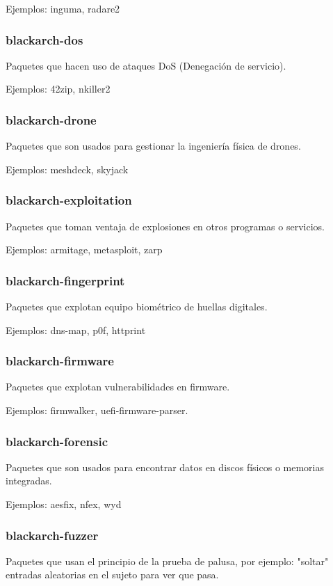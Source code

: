\documentclass[a4paper, oneside, 11pt]{book}
\begin{document}
Ejemplos: inguma, radare2

\subsubsection{blackarch-dos}
Paquetes que hacen uso de ataques DoS (Denegación de servicio).

Ejemplos: 42zip, nkiller2

\subsubsection{blackarch-drone}
Paquetes que son usados para gestionar la ingeniería física de drones.

Ejemplos: meshdeck, skyjack

\subsubsection{blackarch-exploitation}
Paquetes que toman ventaja de explosiones en otros programas o servicios.

Ejemplos: armitage, metasploit, zarp

\subsubsection{blackarch-fingerprint}
Paquetes que explotan equipo biométrico de huellas digitales.

Ejemplos: dns-map, p0f, httprint

\subsubsection{blackarch-firmware}
Paquetes que explotan vulnerabilidades en firmware.

Ejemplos: firmwalker, uefi-firmware-parser.

\subsubsection{blackarch-forensic}
Paquetes que son usados para encontrar datos en discos físicos o memorias integradas.

Ejemplos: aesfix, nfex, wyd

\subsubsection{blackarch-fuzzer}
Paquetes que usan el principio de la prueba de palusa, por ejemplo:
"soltar" entradas aleatorias en el sujeto para ver que pasa.
\end{document}

